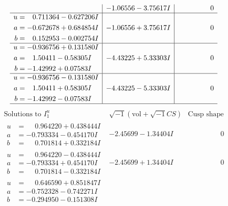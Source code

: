 \documentclass[1p]{elsarticle_modified}
\theoremstyle{definition}
\newcommand{\I}{\sqrt{-1}}
\begin{document}
$$\begin{array}{c|c|c}
 & -1.06556 - 3.75617 I & \phantom{-0.000000 } 0 \\ \hline\begin{aligned}
u &= \phantom{-}0.711364 - 0.627206 I \\
a &= -0.672678 + 0.684854 I \\
b &= \phantom{-}0.152953 - 0.002754 I\end{aligned}
 & -1.06556 + 3.75617 I & \phantom{-0.000000 } 0 \\ \hline\begin{aligned}
u &= -0.936756 + 0.131580 I \\
a &= \phantom{-}1.50411 - 0.58305 I \\
b &= -1.42992 + 0.07583 I\end{aligned}
 & -4.43225 + 5.33303 I & \phantom{-0.000000 } 0 \\ \hline\begin{aligned}
u &= -0.936756 - 0.131580 I \\
a &= \phantom{-}1.50411 + 0.58305 I \\
b &= -1.42992 - 0.07583 I\end{aligned}
 & -4.43225 - 5.33303 I & \phantom{-0.000000 } 0\\
 \hline 
 \end{array}$$\newpage$$\begin{array}{c|c|c}  
\text{Solutions to }I^u_{1}& \I (\text{vol} + \sqrt{-1}CS) & \text{Cusp shape}\\
 \hline 
\begin{aligned}
u &= \phantom{-}0.964220 + 0.438444 I \\
a &= -0.793334 - 0.454170 I \\
b &= \phantom{-}0.701814 + 0.332184 I\end{aligned}
 & -2.45699 - 1.34404 I & \phantom{-0.000000 } 0 \\ \hline\begin{aligned}
u &= \phantom{-}0.964220 - 0.438444 I \\
a &= -0.793334 + 0.454170 I \\
b &= \phantom{-}0.701814 - 0.332184 I\end{aligned}
 & -2.45699 + 1.34404 I & \phantom{-0.000000 } 0 \\ \hline\begin{aligned}
u &= \phantom{-}0.646590 + 0.851847 I \\
a &= -0.752328 - 0.742271 I \\
b &= -0.294950 - 0.151308 I\end{aligned}

\end{array}$$
\end{document}
